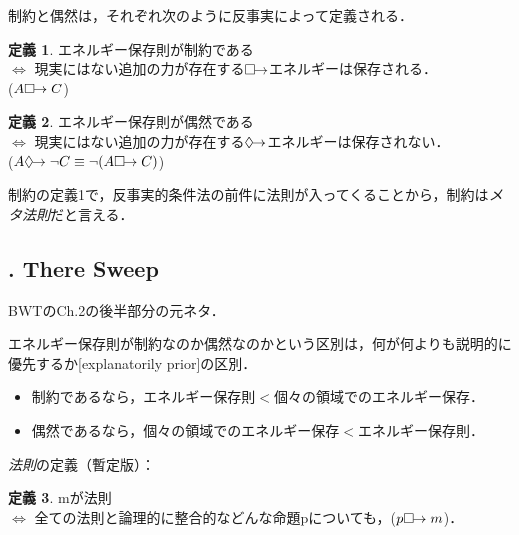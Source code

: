 \documentclass[twoside,14Q,dvipdfmx,uplatex]{jsarticle}
\theoremstyle{definition}
\newtheorem{dfn}{定義}
\begin{document}

制約と偶然は，それぞれ次のように反事実によって定義される．
\begin{dfn}
エネルギー保存則が制約である\\
$\Longleftrightarrow$
現実にはない追加の力が存在する$\Box\hspace{-4pt}\rightarrow$エネルギーは保存される．\\
($A\Box\hspace{-4pt}\rightarrow C$)
\end{dfn}
\begin{dfn}
エネルギー保存則が偶然である\\
$\Longleftrightarrow$
現実にはない追加の力が存在する$\Diamond\hspace{-4pt}\rightarrow$エネルギーは保存されない．\\
($A\Diamond\hspace{-4pt}\rightarrow\lnot C\equiv \lnot(A\Box\hspace{-4pt}\rightarrow C)$)
\end{dfn}
制約の定義1で，反事実的条件法の前件に法則が入ってくることから，制約は\emph{メタ法則}だと言える\citep[170]{Lange2012}．

\subsection{\cite{Lange2012}. There Sweep}
BWTのCh.2の後半部分の元ネタ．

エネルギー保存則が制約なのか偶然なのかという区別は，何が何よりも説明的に優先するか[explanatorily prior]の区別\citep[157]{Lange2012}．
\begin{itemize}
	\item 制約であるなら，エネルギー保存則$<$個々の領域でのエネルギー保存．
	\item 偶然であるなら，個々の領域でのエネルギー保存$<$エネルギー保存則．
\end{itemize}

\emph{法則}の定義（暫定版）\citep[171--2]{Lange2012}：
\begin{dfn}
mが法則\\
$\Longleftrightarrow$ 全ての法則と論理的に整合的などんな命題pについても，($p\Box\hspace{-4pt}\rightarrow m$)．
\end{dfn}
\end{document}
